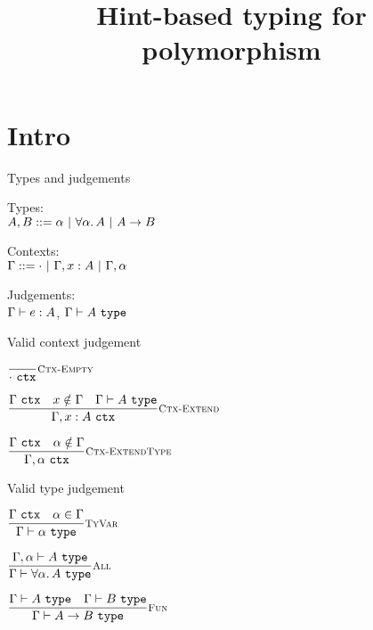 \documentclass{beamer}
\title{Hint-based typing for polymorphism}
\date{}
\begin{document}
\frame{\titlepage}

\section{Intro}

\begin{frame}{Types and judgements}

Types: \\
$A, B ::= \alpha \pipe \ForallT{\alpha}{A} \pipe \Fun{A}{B}$

\vspace{1em}

Contexts: \\
$\Gamma ::= \emptytypingctx \pipe \extend{\Gamma}{x}{A} \pipe \extendtype{\Gamma}{\alpha}$

\vspace{1em}

Judgements: \\
$\typing{e}{A}$, $\type{A}$

\end{frame}

\begin{frame}{Valid context judgement}

\begin{center}
  $\infrule[Ctx-Empty]{}{\ctx{\emptytypingctx}}$

  \vspace{2em}

  $\infrule[Ctx-Extend]{\ctx{\Gamma} \quad \sidecond{x \notin \Gamma} \quad \type{A}}{\ctx{\extend{\Gamma}{x}{A}}}$

  \vspace{2em}

  $\infrule[Ctx-ExtendType]{\ctx{\Gamma} \quad \sidecond{\alpha \notin \Gamma}}{\ctx{\extendtype{\Gamma}{\alpha}}}$
\end{center}

\end{frame}

\begin{frame}{Valid type judgement}

\begin{center}
  $\infrule[TyVar]{\ctx{\Gamma} \quad \sidecond{\alpha \in \Gamma}}{\type{\alpha}}$

  \vspace{2em}

  $\infrule[All]{\type[\extendtype{\Gamma}{\alpha}]{A}}{\type{\ForallT{\alpha}{A}}}$

  \vspace{2em}

  $\infrule[Fun]{\type{A} \quad \type{B}}{\type{\Fun{A}{B}}}$
\end{center}

\end{frame}
\end{document}

